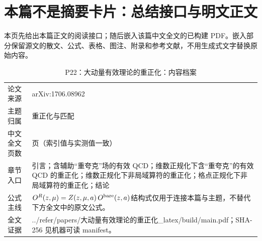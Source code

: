 \documentclass[UTF8,11pt,oneside]{ctexbook}
\begin{document}
\section*{本篇不是摘要卡片：总结接口与明文正文}
本页先给出本篇正文的阅读接口；随后嵌入该篇中文全文的已构建 PDF。嵌入部分保留源文的散文、公式、表格、图注、附录和参考文献，不用生成式文字替换原始内容。
\begin{table}[htbp]
  \centering
  \caption{P22：大动量有效理论的重正化：内容档案}
  \small
  \begin{tabularx}{0.96\textwidth}{@{}p{3.3cm}>{\raggedright\arraybackslash}X@{}}
    \toprule
    论文来源 & arXiv:1706.08962 \\
    主题归属 & 重正化与匹配 \\
    中文全文页数 & 6 页（索引值与实测值一致） \\
    章节入口 & 引言；含辅助“重夸克”场的有效 QCD；维数正规化下含“重夸克”的有效 QCD 的重正化；维数正规化下非局域算符的重正化；格点正规化下非局域算符的重正化；结论 \\
    公式主线 & $O^{R}(z,\mu)=Z(z,\mu,a)\,O^{\rm bare}(z,a)$\newline\scriptsize 结构式仅用于连接本篇与主题，不替代下方全文中的原文公式。 \\
    全文证据 & ../\allowbreak{}refer/\allowbreak{}papers/\allowbreak{}大动量有效理论的重正化\_\allowbreak{}latex/\allowbreak{}build/\allowbreak{}main.pdf；SHA-256 见机器可读 manifest。 \\
    \bottomrule
  \end{tabularx}
\end{table}
\end{document}
